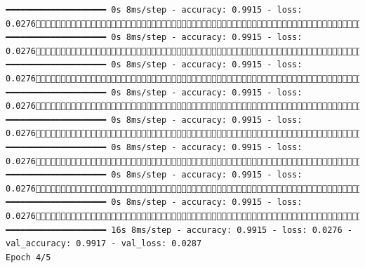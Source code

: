 \documentclass[
  letterpaper,
  DIV=11,
  numbers=noendperiod]{scrreprt}
\begin{document}
\begin{verbatim}
━━━━━━━━━━━━━━━━━━━━ 0s 8ms/step - accuracy: 0.9915 - loss: 0.02761831/1875 ━━━━━━━━━━━━━━━━━━━━ 0s 8ms/step - accuracy: 0.9915 - loss: 0.02761839/1875 ━━━━━━━━━━━━━━━━━━━━ 0s 8ms/step - accuracy: 0.9915 - loss: 0.02761847/1875 ━━━━━━━━━━━━━━━━━━━━ 0s 8ms/step - accuracy: 0.9915 - loss: 0.02761855/1875 ━━━━━━━━━━━━━━━━━━━━ 0s 8ms/step - accuracy: 0.9915 - loss: 0.02761861/1875 ━━━━━━━━━━━━━━━━━━━━ 0s 8ms/step - accuracy: 0.9915 - loss: 0.02761867/1875 ━━━━━━━━━━━━━━━━━━━━ 0s 8ms/step - accuracy: 0.9915 - loss: 0.02761873/1875 ━━━━━━━━━━━━━━━━━━━━ 0s 8ms/step - accuracy: 0.9915 - loss: 0.02761875/1875 ━━━━━━━━━━━━━━━━━━━━ 16s 8ms/step - accuracy: 0.9915 - loss: 0.0276 - val_accuracy: 0.9917 - val_loss: 0.0287
Epoch 4/5

\end{verbatim}
\end{document}
